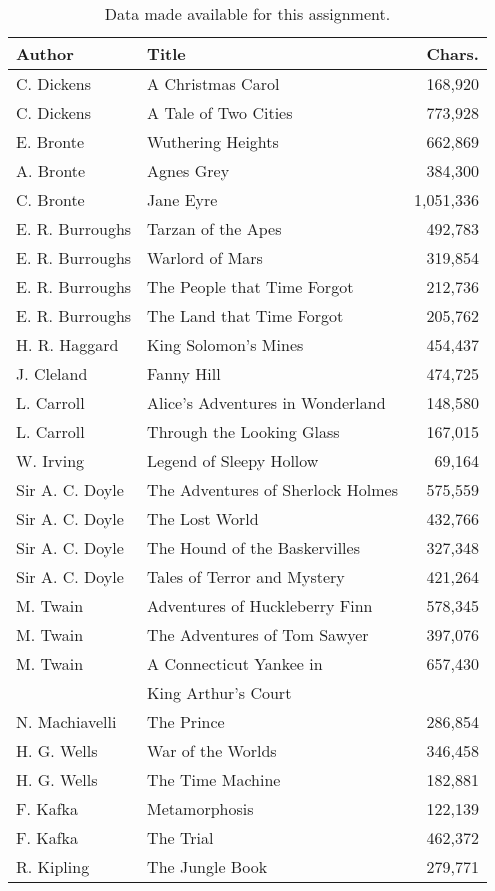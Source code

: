 \documentclass[conference]{IEEEtran}
\begin{document}
\begin{table}
\caption{Data made available for this assignment.\label{tab:books}}
\vspace{-10pt}
\begin{center}
\begin{tabular}{llr}
\hline
Author & Title & Chars. \\
\hline
C. Dickens & A Christmas Carol & 168,920 \\
C. Dickens & A Tale of Two Cities & 773,928 \\
E. Bronte & Wuthering Heights & 662,869 \\
A. Bronte & Agnes Grey & 384,300 \\
C. Bronte & Jane Eyre & 1,051,336 \\
E. R. Burroughs & Tarzan of the Apes & 492,783 \\
E. R. Burroughs & Warlord of Mars & 319,854 \\
E. R. Burroughs & The People that Time Forgot & 212,736 \\
E. R. Burroughs & The Land that Time Forgot & 205,762 \\
H. R. Haggard & King Solomon's Mines & 454,437 \\
J. Cleland & Fanny Hill & 474,725 \\
L. Carroll & Alice's Adventures in Wonderland & 148,580 \\
L. Carroll & Through the Looking Glass & 167,015 \\
W. Irving & Legend of Sleepy Hollow & 69,164 \\
Sir A. C. Doyle & The Adventures of Sherlock Holmes & 575,559 \\
Sir A. C. Doyle & The Lost World & 432,766 \\
Sir A. C. Doyle & The Hound of the Baskervilles & 327,348 \\
Sir A. C. Doyle & Tales of Terror and Mystery & 421,264 \\
M. Twain & Adventures of Huckleberry Finn & 578,345 \\
M. Twain & The Adventures of Tom Sawyer & 397,076 \\
M. Twain & A Connecticut Yankee in & 657,430 \\
           & King Arthur's Court & \\
N. Machiavelli & The Prince & 286,854 \\
H. G. Wells & War of the Worlds & 346,458 \\
H. G. Wells & The Time Machine & 182,881 \\
F. Kafka & Metamorphosis & 122,139 \\
F. Kafka & The Trial & 462,372 \\
R. Kipling & The Jungle Book & 279,771 \\
\hline
\end{tabular}
\end{center}
\end{table}
\end{document}
